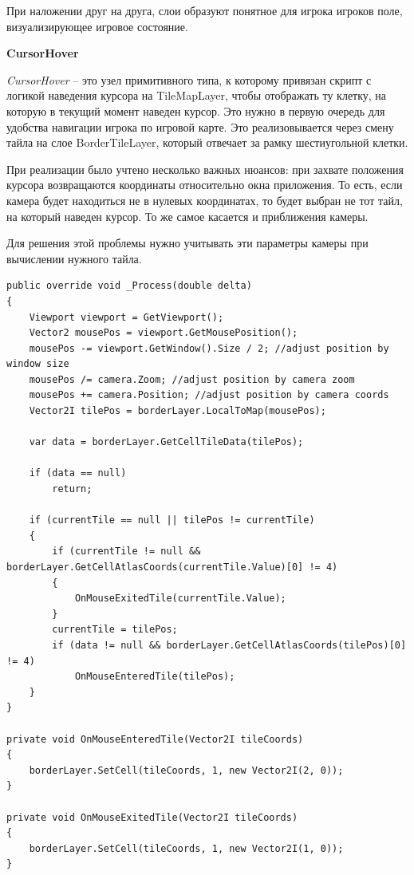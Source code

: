             При наложении друг на друга, слои образуют понятное для игрока игроков поле, визуализирующее игровое состояние.

            \textbf{CursorHover}

            \textit{CursorHover} -- это узел примитивного типа, к которому привязан скрипт с логикой наведения курсора на TileMapLayer, чтобы отображать ту клетку, на которую
            в текущий момент наведен курсор. Это нужно в первую очередь для удобства навигации игрока по игровой карте. Это реализовывается через смену тайла на слое BorderTileLayer, который
            отвечает за рамку шестиугольной клетки.

            При реализации было учтено несколько важных нюансов: при захвате положения курсора возвращаются координаты относительно окна приложения. То есть,
            если камера будет находиться не в нулевых координатах, то будет выбран не тот тайл, на который наведен курсор. То же самое касается и приближения камеры.

            Для решения этой проблемы нужно учитывать эти параметры камеры при вычислении нужного тайла.

            \begin{lstlisting}[caption=Реализация подсветки тайла]
public override void _Process(double delta)
{
    Viewport viewport = GetViewport();
    Vector2 mousePos = viewport.GetMousePosition();
    mousePos -= viewport.GetWindow().Size / 2; //adjust position by window size
    mousePos /= camera.Zoom; //adjust position by camera zoom
    mousePos += camera.Position; //adjust position by camera coords
    Vector2I tilePos = borderLayer.LocalToMap(mousePos);

    var data = borderLayer.GetCellTileData(tilePos);

    if (data == null)
        return;

    if (currentTile == null || tilePos != currentTile)
    {
        if (currentTile != null && borderLayer.GetCellAtlasCoords(currentTile.Value)[0] != 4)
        {
            OnMouseExitedTile(currentTile.Value);
        }
        currentTile = tilePos;
        if (data != null && borderLayer.GetCellAtlasCoords(tilePos)[0] != 4)
            OnMouseEnteredTile(tilePos);
    }
}

private void OnMouseEnteredTile(Vector2I tileCoords)
{
    borderLayer.SetCell(tileCoords, 1, new Vector2I(2, 0));
}

private void OnMouseExitedTile(Vector2I tileCoords)
{
    borderLayer.SetCell(tileCoords, 1, new Vector2I(1, 0));
}
            \end{lstlisting}


